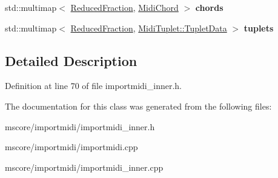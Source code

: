 \begin{DoxyCompactItemize}
\mbox{\label{class_ms_1_1_m_track_a0871d9a10ff4b1bc15e3bf52fd213f14}} 
std\+::multimap$<$ \hyperlink{class_ms_1_1_reduced_fraction}{Reduced\+Fraction}, \hyperlink{class_ms_1_1_midi_chord}{Midi\+Chord} $>$ {\bfseries chords}
\item 
\mbox{\label{class_ms_1_1_m_track_afe4606fbfe78f1f21ceb40d60cdaf5bb}} 
std\+::multimap$<$ \hyperlink{class_ms_1_1_reduced_fraction}{Reduced\+Fraction}, \hyperlink{struct_ms_1_1_midi_tuplet_1_1_tuplet_data}{Midi\+Tuplet\+::\+Tuplet\+Data} $>$ {\bfseries tuplets}
\end{DoxyCompactItemize}


\subsection{Detailed Description}


Definition at line 70 of file importmidi\+\_\+inner.\+h.



The documentation for this class was generated from the following files\+:\begin{DoxyCompactItemize}
\item 
mscore/importmidi/importmidi\+\_\+inner.\+h\item 
mscore/importmidi/importmidi.\+cpp\item 
mscore/importmidi/importmidi\+\_\+inner.\+cpp\end{DoxyCompactItemize}
